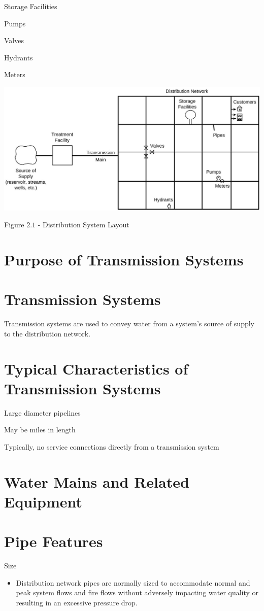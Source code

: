 \documentclass[10pt]{article}
\begin{document}
Storage Facilities

Pumps

Valves

Hydrants

Meters

\includegraphics[max width=\textwidth]{DistributionSystemLayout}

Figure $2.1$ - Distribution System Layout

\section{Purpose of Transmission Systems}
\section{Transmission Systems}
Transmission systems are used to convey water from a system's source of supply to the distribution network.

\section{Typical Characteristics of Transmission Systems}
Large diameter pipelines

May be miles in length

Typically, no service connections directly from a transmission system

\section{Water Mains and Related Equipment}
\section{Pipe Features}
Size

\begin{itemize}
  \item Distribution network pipes are normally sized to accommodate normal and peak system flows and fire flows without adversely impacting water quality or resulting in an excessive pressure drop.
\end{itemize}
\end{document}

